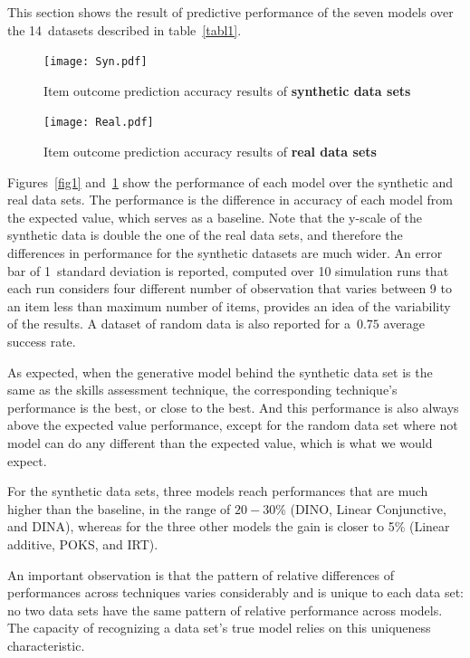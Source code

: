 This section shows the result of predictive performance of the seven models over the 14~datasets described in table~\ref{tabl1}. 

\begin{figure}
\centering
\texttt{[image: Syn.pdf]}
\caption{Item outcome prediction accuracy results of {\textbf{synthetic data sets}}}
\label{fig1}

{\texttt{[image: Real.pdf]}}
\caption{Item outcome prediction accuracy results of {\textbf{real data sets}}}
\label{fig2}
\end{figure}

Figures~\ref{fig1} and~\ref{fig2} show the performance of each model over the synthetic and real data sets.  The performance is the difference in accuracy of each model from the expected value, which serves as a baseline. Note that the y-scale of the synthetic data is double the one of the real data sets, and therefore the differences in performance for the synthetic datasets are much wider.  An error bar of 1~standard deviation is reported, computed over 10 simulation runs that each run considers four different number of observation that varies between 9 to an item less than maximum number of items, provides an idea of the variability of the results. A dataset of random data is also reported for a~$0.75$ average success rate.

As expected, when the generative model behind the synthetic data set is the same as the skills assessment technique, the corresponding technique's performance is the best, or close to the best.  And this performance is also always above the expected value performance, except for the random data set where not model can do any different than the expected value, which is what we would expect.

For the synthetic data sets, three models reach performances that are much higher than the baseline, in the range of $20-30$\% (DINO, Linear Conjunctive, and DINA), whereas for the three other models the gain is closer to 5\% (Linear additive, POKS, and IRT).

An important observation is that the pattern of relative differences of performances across techniques varies considerably and is unique to each data set: no two data sets have the same pattern of relative performance across models.  The capacity of recognizing a data set's true model relies on this uniqueness characteristic.

